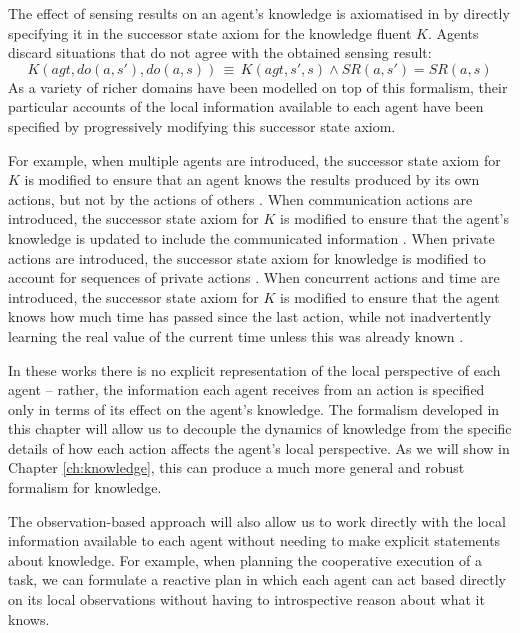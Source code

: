 The effect of sensing results on an agent's knowledge is axiomatised
in \citep{scherl03sc_knowledge} by directly specifying it in the
successor state axiom for the knowledge fluent $K$. Agents discard
situations that do not agree with the obtained sensing result:\[
K(agt,do(a,s'),do(a,s))\,\equiv\, K(agt,s',s)\wedge SR(a,s')=SR(a,s)\]
 As a variety of richer domains have been modelled on top of this
formalism, their particular accounts of the local information available
to each agent have been specified by progressively modifying this
successor state axiom.

For example, when multiple agents are introduced, the successor state
axiom for $K$ is modified to ensure that an agent knows the results
produced by its own actions, but not by the actions of others \citep{shapiro98specifying_ma_systems}.
When communication actions are introduced, the successor state axiom
for $K$ is modified to ensure that the agent's knowledge is updated
to include the communicated information \citep{shapiro01casl_feat_inter,shapiro07sc_goal_change}.
When private actions are introduced, the successor state axiom for
knowledge is modified to account for sequences of private actions
\citep{Lesperance99sitcalc_approach}. When concurrent actions and
time are introduced, the successor state axiom for $K$ is modified
to ensure that the agent knows how much time has passed since the
last action, while not inadvertently learning the real value of the
current time unless this was already known \citep{scherl03conc_knowledge}.

In these works there is no explicit representation of the local perspective
of each agent -- rather, the information each agent receives from
an action is specified only in terms of its effect on the agent's
knowledge. The formalism developed in this chapter will allow us to
decouple the dynamics of knowledge from the specific details of how
each action affects the agent's local perspective. As we will show
in Chapter \ref{ch:knowledge}, this can produce a much more general
and robust formalism for knowledge.

The observation-based approach will also allow us to work directly
with the local information available to each agent without needing
to make explicit statements about knowledge. For example, when planning
the cooperative execution of a task, we can formulate a reactive plan
in which each agent can act based directly on its local observations
without having to introspective reason about what it knows.\\


